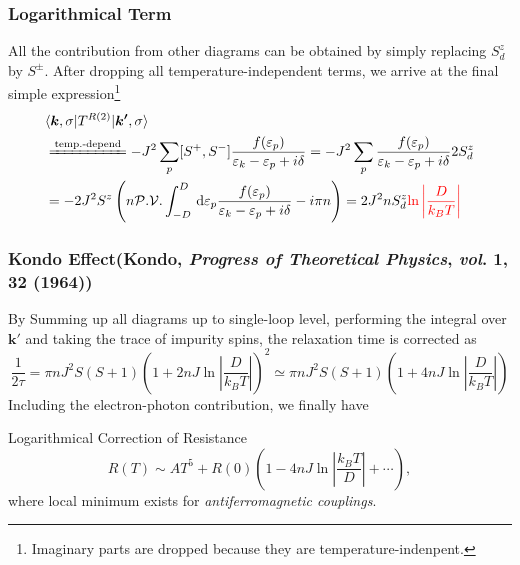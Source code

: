 \documentclass[10pt,aspectratio=43,xcolor=x11names]{beamer}%
\begin{document}
		\begin{frame}\frametitle{Logarithmical Term}
			All the contribution from other diagrams can be obtained by simply replacing $S_d^z$ by $S^\pm$. After dropping all temperature-independent terms, we arrive at the final simple expression\footnote{Imaginary parts are dropped because they are temperature-indenpent.}
			\begin{align*}
				&\langle\bm{k},\sigma|T^{R(2)}|\bm{k'},\sigma\rangle\\
				&\xlongequal{\text{temp.-depend}}-J^2\sum_p[S^+,S^-]\dfrac{f(\varepsilon_p)}{\varepsilon_k- \varepsilon_p+i\delta}=-J^2\sum_p\dfrac{f(\varepsilon_p)}{\varepsilon_k- \varepsilon_p+i\delta}2S_d^z\nonumber\\
				&=-2J^2S^z\left(n\mathcal{P.V.}\int_{-D}^D\,\dd \varepsilon_p\dfrac{f(\varepsilon_p)}{\varepsilon_k- \varepsilon_p+i\delta}-i\pi n\right)=2J^2nS_d^z{\color{red}\ln\left|\dfrac{D}{k_BT}\right|}
			\end{align*}
		\end{frame}
		\begin{frame}\frametitle{Kondo Effect({\footnotesize Kondo, \textit{Progress of Theoretical Physics}, \textit{vol}. \textbf{1}, 32 (1964)})}
			By Summing up all diagrams up to single-loop level, performing the integral over $\bm{k'}$ and taking the trace of impurity spins, the relaxation time is corrected as
			\begin{equation*}
				\dfrac{1}{2\tau}=\pi n J^2S(S+1)\left(1+2nJ\ln\left|\dfrac{D}{k_BT}\right|\right)^2\simeq\pi n J^2S(S+1)\left(1+4nJ\ln\left|\dfrac{D}{k_BT}\right|\right)
			\end{equation*}
			Including the electron-photon contribution, we finally have
			\begin{block}{Logarithmical Correction of Resistance}
				\begin{equation*}
					R(T)\sim AT^5+R(0)\left(1-4n J\ln\left|\dfrac{k_BT}{D}\right|+\cdots\right),
				\end{equation*}
				where local minimum exists for \emph{antiferromagnetic couplings}.
			\end{block}
		\end{frame}
\end{document}
